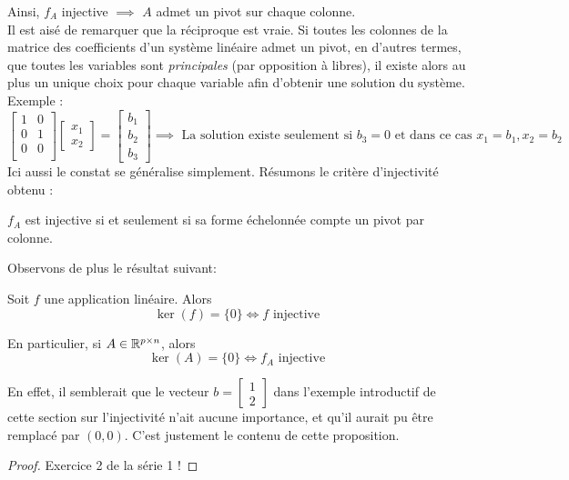 \noindent Ainsi, $f_A$ injective $\implies$ $A$ admet un pivot sur chaque colonne. \\

\noindent Il est aisé de remarquer que la réciproque est vraie. Si toutes les colonnes de la matrice des coefficients d'un système linéaire admet un pivot, en d'autres termes, que toutes les variables sont \textit{principales} (par opposition à libres), il existe alors au plus un unique choix pour chaque variable afin d'obtenir une solution du système. Exemple :
$$\begin{bmatrix}
1 & 0\\
0 & 1\\
0 & 0\\
\end{bmatrix}\begin{bmatrix}
x_1 \\ x_2
\end{bmatrix} = \begin{bmatrix}
b_1 \\ b_2 \\ b_3
\end{bmatrix} \implies  \text{ La solution existe seulement si }b_3 = 0\text{ et dans ce cas }x_1 = b_1, x_2 = b_2
$$
Ici aussi le constat se généralise simplement. Résumons le critère d'injectivité obtenu :
\begin{boxprop}
$f_A$ est injective si et seulement si sa forme échelonnée compte un pivot par colonne.
\end{boxprop}

Observons de plus le résultat suivant:
\begin{boxthm}
Soit $f$ une application linéaire. Alors
$$\ker(f) = \{0\} \iff f \text{ injective}$$

En particulier, si $A \in \mathbb{R}^{p \times n}$, alors
$$\ker(A) = \{0\} \iff f_A \text{ injective}$$
\end{boxthm}
\noindent En effet, il semblerait que le vecteur $b = \begin{bmatrix}
1 \\ 2 
\end{bmatrix}$ dans l'exemple introductif de cette section sur l'injectivité n'ait aucune importance, et qu'il aurait pu être remplacé par $(0,0)$. C'est justement le contenu de cette proposition.

\begin{proof}
Exercice 2 de la série 1 !
\end{proof}


